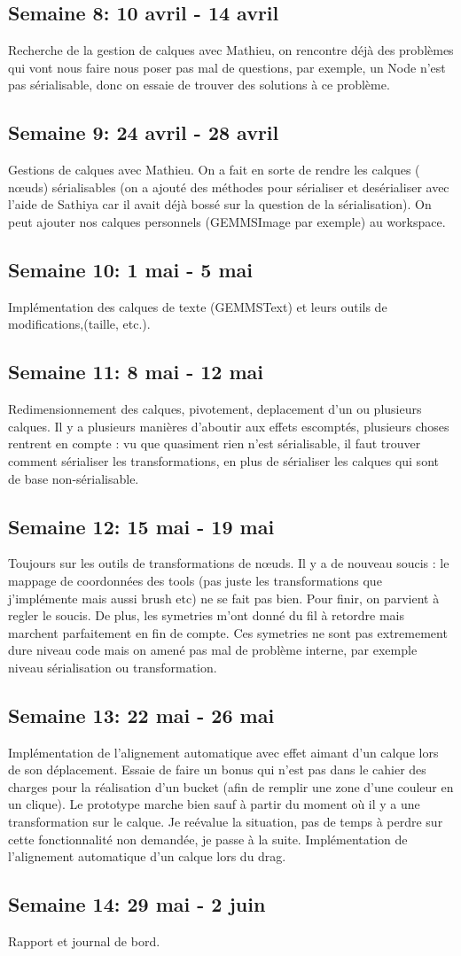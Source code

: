 \subsection{Semaine 8: 10 avril - 14 avril}
Recherche de la gestion de calques avec Mathieu, on rencontre déjà des problèmes qui vont nous faire nous poser pas mal de questions, par exemple, un Node n'est pas sérialisable, donc on essaie de trouver des solutions à ce problème.
\subsection{Semaine 9: 24 avril - 28 avril}
Gestions de calques avec Mathieu. On a fait en sorte de rendre les calques ( n\oe uds) sérialisables (on a ajouté des méthodes pour sérialiser et desérialiser avec l'aide de Sathiya car il avait déjà bossé sur la question de la sérialisation). On peut ajouter nos calques personnels (GEMMSImage par exemple) au workspace.
\subsection{Semaine 10: 1 mai - 5 mai}
Implémentation des calques de texte (GEMMSText) et leurs outils de modifications,(taille, etc.).
\subsection{Semaine 11: 8 mai - 12 mai} 
Redimensionnement des calques, pivotement, deplacement d'un ou plusieurs calques. Il y a plusieurs manières d'aboutir aux effets escomptés, plusieurs choses rentrent en compte : vu que quasiment rien n'est sérialisable, il faut trouver comment sérialiser les transformations, en plus de sérialiser les calques qui sont de base non-sérialisable.
\subsection{Semaine 12: 15 mai - 19 mai}
Toujours sur les outils de transformations de n\oe uds. Il y a de nouveau soucis : le mappage de coordonnées des tools (pas juste les transformations que j'implémente mais aussi brush etc) ne se fait pas bien. Pour finir, on parvient à regler le soucis. De plus, les symetries m'ont donné du fil à retordre mais marchent parfaitement en fin de compte. Ces symetries ne sont pas extremement dure niveau code mais on amené pas mal de problème interne, par exemple niveau sérialisation ou transformation.
\subsection{Semaine 13: 22 mai - 26 mai}
Implémentation de l'alignement automatique avec effet aimant d'un calque lors de son déplacement.
Essaie de faire un bonus qui n'est pas dans le cahier des charges pour la réalisation d'un bucket (afin de remplir une zone d'une couleur en un clique). Le prototype marche bien sauf à partir du moment où il y a une transformation sur le calque. Je reévalue la situation, pas de temps à perdre sur cette fonctionnalité non demandée, je passe à la suite. Implémentation de l'alignement automatique d'un calque lors du drag.
\subsection{Semaine 14: 29 mai - 2 juin}
Rapport et journal de bord.





